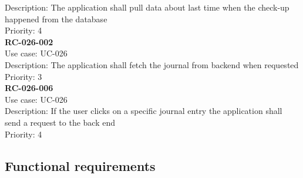 Description: The application shall pull data about last time when the check-up happened from the database \\
Priority: 4 \\
\newline
\textbf{RC-026-002} \\
Use case: UC-026 \\
Description: The application shall fetch the journal from backend when requested \\
Priority: 3 \\
\newline
\textbf{RC-026-006} \\
Use case: UC-026 \\
Description: If the user clicks on a specific journal entry the application shall send a request to the back end\\
Priority: 4 \\
\newline
\subsection{Functional requirements}

